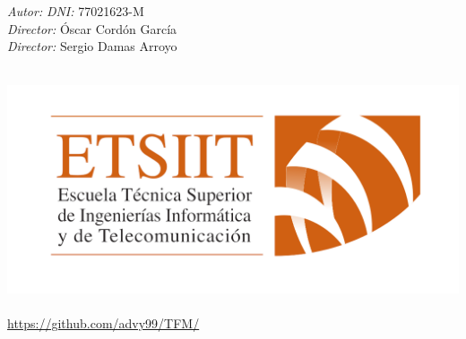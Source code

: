 \documentclass[12pt, spanish]{article}
\begin{document}
\begin{titlepage}
    \begin{minipage}{\textwidth}
		\begin{center}
			\large
			\emph{Autor:} \theauthor \hspace{0.5 cm}
			\emph{DNI:} 77021623-M \vspace{0.2cm} \\
			\emph{Director:} Óscar Cordón García \\
			\emph{Director:} Sergio Damas Arroyo \\
		\end{center}
    \end{minipage}\\[0.5cm]
	 \includegraphics[scale = 0.20]{logo_etsiit.png}\\[0.3 cm]
    {\large \thedate}\\[0.5cm]
	 \url{https://github.com/advy99/TFM/}
    \doclicenseThis
\end{titlepage}





\pagebreak


\pagestyle{fancy}




\tableofcontents
\pagebreak


























\newpage


\end{document}
